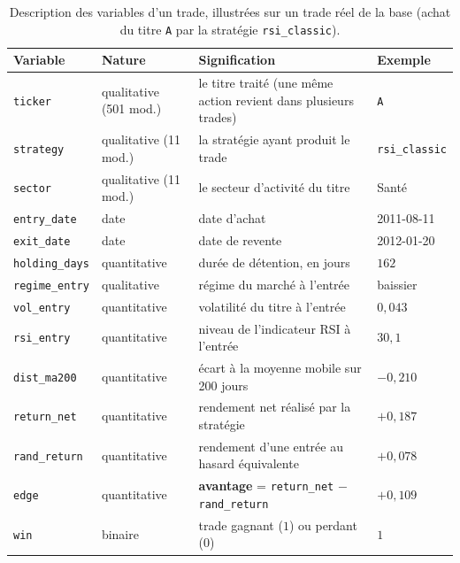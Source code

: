\begin{table}[H]
\centering
\caption{Description des variables d'un trade, illustrées sur un trade réel
de la base (achat du titre \texttt{A} par la stratégie \texttt{rsi\_classic}).}
\label{tab:dico-trades}
\renewcommand{\arraystretch}{1.3}
\small
\begin{tabular}{@{}>{\raggedright\arraybackslash}p{2.4cm}>{\raggedright\arraybackslash}p{2.6cm}>{\raggedright\arraybackslash}p{5.6cm}l@{}}
\toprule
Variable & Nature & Signification & Exemple \\
\midrule
\texttt{ticker}       & qualitative (501 mod.) & le titre traité (une même action revient dans plusieurs trades) & \texttt{A} \\
\texttt{strategy}     & qualitative (11 mod.)  & la stratégie ayant produit le trade & \texttt{rsi\_classic} \\
\texttt{sector}       & qualitative (11 mod.)  & le secteur d'activité du titre & Santé \\
\texttt{entry\_date}  & date                   & date d'achat & 2011-08-11 \\
\texttt{exit\_date}   & date                   & date de revente & 2012-01-20 \\
\texttt{holding\_days}& quantitative           & durée de détention, en jours & $162$ \\
\texttt{regime\_entry}& qualitative            & régime du marché à l'entrée & baissier \\
\texttt{vol\_entry}   & quantitative           & volatilité du titre à l'entrée & $0{,}043$ \\
\texttt{rsi\_entry}   & quantitative           & niveau de l'indicateur RSI à l'entrée & $30{,}1$ \\
\texttt{dist\_ma200}  & quantitative           & écart à la moyenne mobile sur 200 jours & $-0{,}210$ \\
\texttt{return\_net}  & quantitative           & rendement net réalisé par la stratégie & $+0{,}187$ \\
\texttt{rand\_return} & quantitative           & rendement d'une entrée au hasard équivalente & $+0{,}078$ \\
\texttt{edge}         & quantitative           & \textbf{avantage} = \texttt{return\_net} $-$ \texttt{rand\_return} & $+0{,}109$ \\
\texttt{win}          & binaire                & trade gagnant ($1$) ou perdant ($0$) & $1$ \\
\bottomrule
\end{tabular}
\end{table}

